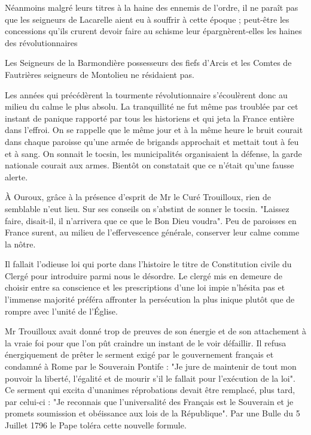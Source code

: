 Néanmoins malgré leurs titres à la haine des ennemis de l'ordre, il ne paraît pas que les seigneurs de Lacarelle aient eu à souffrir à cette époque ; peut-être les concessions qu'ils crurent devoir faire au schisme leur épargnèrent-elles les haines des révolutionnaires

Les Seigneurs de la Barmondière possesseurs des fiefs d'Arcis et les Comtes de Fautrières seigneurs de Montolieu ne résidaient pas.

Les années qui précédèrent la tourmente révolutionnaire s'écoulèrent donc au milieu du calme le plus absolu. La tranquillité ne fut même pas troublée par cet instant de panique rapporté par tous les historiens et qui jeta la France entière dans l'effroi. On se rappelle que le même jour et à la même heure le bruit courait dans chaque paroisse qu'une armée de brigands approchait et mettait tout à feu et à sang. On sonnait le tocsin, les municipalités organisaient la défense, la garde nationale courait aux armes. Bientôt on constatait que ce n'était qu'une fausse alerte.

À Ouroux, grâce à la présence d'esprit de Mr le Curé Trouilloux, rien de semblable n'eut lieu. Sur ses conseils on s'abstint de sonner le tocsin. "Laissez faire, disait-il, il n'arrivera que ce que le Bon Dieu voudra". Peu de paroisses en France surent, au milieu de l'effervescence générale, conserver leur calme comme la nôtre.

Il fallait l'odieuse loi qui porte dans l'histoire le titre de Constitution civile du Clergé pour introduire parmi nous le désordre. Le clergé mis en demeure de choisir entre sa conscience et les prescriptions d'une loi impie n'hésita pas et l'immense majorité préféra affronter la persécution la plus inique plutôt que de rompre avec l'unité de l'Église.

Mr Trouilloux avait donné trop de preuves de son énergie et de son attachement à la vraie foi pour que l'on pût craindre un instant de le voir défaillir. Il refusa énergiquement de prêter le serment exigé par le gouvernement français et condamné à Rome par le Souverain Pontife : "Je jure de maintenir de tout mon pouvoir la liberté,
l'égalité et de mourir s'il le fallait pour l'exécution de la loi".
Ce serment qui excita d'unanimes réprobations devait être remplacé, plus tard, par celui-ci : "Je reconnais que l'universalité des Français est le Souverain et je promets soumission et obéissance aux lois de la République". Par une Bulle du 5 Juillet 1796 le Pape toléra cette nouvelle formule.

